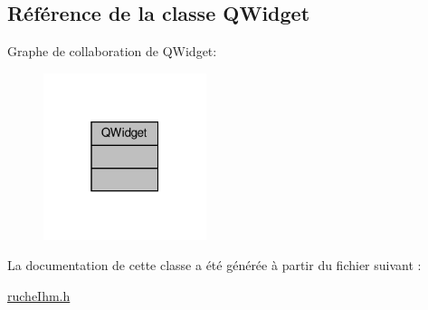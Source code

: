 \hypertarget{class_q_widget}{}\subsection{Référence de la classe Q\+Widget}
\label{class_q_widget}


Graphe de collaboration de Q\+Widget\+:\nopagebreak
\begin{figure}[H]
\begin{center}
\leavevmode
\includegraphics[width=135pt]{class_q_widget__coll__graph}
\end{center}
\end{figure}


La documentation de cette classe a été générée à partir du fichier suivant \+:\begin{DoxyCompactItemize}
\item 
\hyperlink{ruche_ihm_8h}{ruche\+Ihm.\+h}\end{DoxyCompactItemize}
